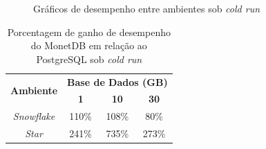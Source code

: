 \begin{figure}[htpb]
        \centering
        \caption{Gráficos de desempenho entre ambientes sob \textit{cold run}}
        \label{fig:qph_model_cold}
\end{figure}

\begin{table}[htpb]
        \centering
        \caption{Porcentagem de ganho de desempenho do MonetDB em relação ao PostgreSQL sob \textit{cold run}}
        \label{tab:ganho_monet_psql_cold}
        \begin{tabular}{|c|c|c|c|}
        \hline
        \multirow{2}{*}{\textbf{Ambiente}} & \multicolumn{3}{c|}{\textbf{Base de Dados (GB)}} \\ \cline{2-4} 
                                           & \textbf{1}     & \textbf{10}    & \textbf{30}    \\ \hline
        \textit{Snowflake}                 & 110\%          & 108\%          & 80\%           \\ \hline
        \textit{Star}                      & 241\%          & 735\%          & 273\%          \\ \hline
        \end{tabular}
\end{table}

